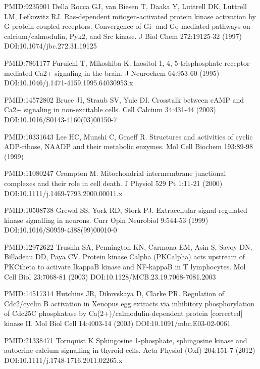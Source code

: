 \begin{thebibliography}{00}
PMID:9235901
 Della Rocca GJ, van Biesen T, Daaka Y, Luttrell DK, Luttrell LM, Lefkowitz RJ.
\newblock Ras-dependent mitogen-activated protein kinase activation by G protein-coupled receptors. Convergence of Gi- and Gq-mediated pathways on calcium/calmodulin, Pyk2, and Src kinase.
\newblock J Biol Chem 272:19125-32 (1997) DOI:10.1074/jbc.272.31.19125

PMID:7861177
 Furuichi T, Mikoshiba K.
\newblock Inositol 1, 4, 5-trisphosphate receptor-mediated Ca2+ signaling in the brain.
\newblock J Neurochem 64:953-60 (1995) DOI:10.1046/j.1471-4159.1995.64030953.x

PMID:14572802
 Bruce JI, Straub SV, Yule DI.
\newblock Crosstalk between cAMP and Ca2+ signaling in non-excitable cells.
\newblock Cell Calcium 34:431-44 (2003) DOI:10.1016/S0143-4160(03)00150-7

PMID:10331643
 Lee HC, Munshi C, Graeff R.
\newblock Structures and activities of cyclic ADP-ribose, NAADP and their metabolic enzymes.
\newblock Mol Cell Biochem 193:89-98 (1999)

PMID:11080247
 Crompton M.
\newblock Mitochondrial intermembrane junctional complexes and their role in cell death.
\newblock J Physiol 529 Pt 1:11-21 (2000) DOI:10.1111/j.1469-7793.2000.00011.x

PMID:10508738
 Grewal SS, York RD, Stork PJ.
\newblock Extracellular-signal-regulated kinase signalling in neurons.
\newblock Curr Opin Neurobiol 9:544-53 (1999) DOI:10.1016/S0959-4388(99)00010-0

PMID:12972622
 Trushin SA, Pennington KN, Carmona EM, Asin S, Savoy DN, Billadeau DD, Paya CV.
\newblock Protein kinase Calpha (PKCalpha) acts upstream of PKCtheta to activate IkappaB kinase and NF-kappaB in T lymphocytes.
\newblock Mol Cell Biol 23:7068-81 (2003) DOI:10.1128/MCB.23.19.7068-7081.2003

PMID:14517314
 	Hutchins JR, Dikovskaya D, Clarke PR.
\newblock Regulation of Cdc2/cyclin B activation in Xenopus egg extracts via inhibitory phosphorylation of Cdc25C phosphatase by Ca(2+)/calmodulin-dependent protein [corrected] kinase II.
\newblock Mol Biol Cell 14:4003-14 (2003) DOI:10.1091/mbc.E03-02-0061

PMID:21338471
 Tornquist K
\newblock Sphingosine 1-phosphate, sphingosine kinase and autocrine calcium signalling in thyroid cells.
\newblock Acta Physiol (Oxf) 204:151-7 (2012) DOI:10.1111/j.1748-1716.2011.02265.x


\end{thebibliography}
